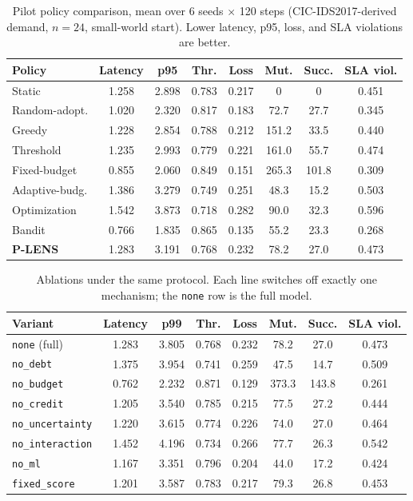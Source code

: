 \documentclass[runningheads]{llncs}
\begin{document}
\begin{table}[t]
\caption{Pilot policy comparison, mean over 6 seeds $\times$ 120 steps
(CIC-IDS2017-derived demand, $n=24$, small-world start). Lower latency,
p95, loss, and SLA violations are better.}
\label{tab:main}
\centering\footnotesize
\begin{tabular}{lccccccc}
\toprule
Policy & Latency & p95 & Thr. & Loss & Mut. & Succ. & SLA viol. \\
\midrule
Static          & 1.258 & 2.898 & 0.783 & 0.217 & 0     & 0     & 0.451 \\
Random-adopt.   & 1.020 & 2.320 & 0.817 & 0.183 & 72.7  & 27.7  & 0.345 \\
Greedy          & 1.228 & 2.854 & 0.788 & 0.212 & 151.2 & 33.5  & 0.440 \\
Threshold       & 1.235 & 2.993 & 0.779 & 0.221 & 161.0 & 55.7  & 0.474 \\
Fixed-budget    & 0.855 & 2.060 & 0.849 & 0.151 & 265.3 & 101.8 & 0.309 \\
Adaptive-budg.  & 1.386 & 3.279 & 0.749 & 0.251 & 48.3  & 15.2  & 0.503 \\
Optimization    & 1.542 & 3.873 & 0.718 & 0.282 & 90.0  & 32.3  & 0.596 \\
Bandit          & 0.766 & 1.835 & 0.865 & 0.135 & 55.2  & 23.3  & 0.268 \\
\midrule
\textbf{P-LENS} & 1.283 & 3.191 & 0.768 & 0.232 & 78.2  & 27.0  & 0.473 \\
\bottomrule
\end{tabular}
\end{table}

\begin{table}[t]
\caption{Ablations under the same protocol. Each line switches off exactly
one mechanism; the \texttt{none} row is the full model.}
\label{tab:ablations}
\centering\footnotesize
\begin{tabular}{lccccccc}
\toprule
Variant & Latency & p99 & Thr. & Loss & Mut. & Succ. & SLA viol. \\
\midrule
\texttt{none} (full)      & 1.283 & 3.805 & 0.768 & 0.232 & 78.2  & 27.0 & 0.473 \\
\texttt{no\_debt}         & 1.375 & 3.954 & 0.741 & 0.259 & 47.5  & 14.7 & 0.509 \\
\texttt{no\_budget}       & 0.762 & 2.232 & 0.871 & 0.129 & 373.3 & 143.8 & 0.261 \\
\texttt{no\_credit}       & 1.205 & 3.540 & 0.785 & 0.215 & 77.5  & 27.2 & 0.444 \\
\texttt{no\_uncertainty}  & 1.220 & 3.615 & 0.774 & 0.226 & 74.0  & 27.0 & 0.464 \\
\texttt{no\_interaction}  & 1.452 & 4.196 & 0.734 & 0.266 & 77.7  & 26.3 & 0.542 \\
\texttt{no\_ml}           & 1.167 & 3.351 & 0.796 & 0.204 & 44.0  & 17.2 & 0.424 \\
\texttt{fixed\_score}     & 1.201 & 3.587 & 0.783 & 0.217 & 79.3  & 26.8 & 0.453 \\
\bottomrule
\end{tabular}
\end{table}
\end{document}
